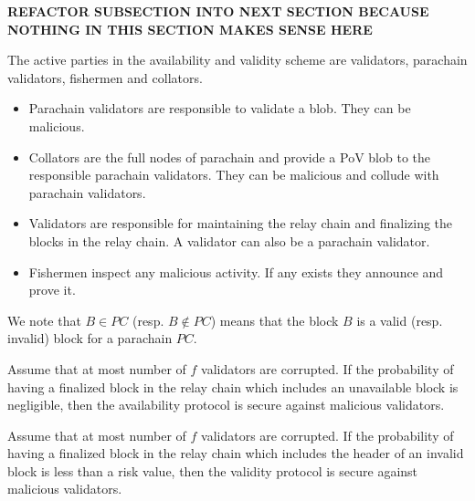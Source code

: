 {\bf REFACTOR SUBSECTION INTO NEXT SECTION BECAUSE NOTHING IN THIS SECTION MAKES SENSE HERE}



The active parties in the availability and validity scheme are validators, parachain validators, fishermen and collators. 


\begin{itemize}
\item Parachain validators are responsible to validate a blob. They can be malicious.
\item Collators are the full nodes of parachain and provide a PoV blob to the responsible parachain validators. They can be malicious and collude with parachain validators.
\item Validators are responsible for maintaining the relay chain and finalizing the blocks in the relay chain. A validator can also be a parachain validator. 
\item Fishermen inspect any malicious activity. If any exists they announce and prove it.  
\end{itemize}


We note that $B\in PC$ (resp. $B \notin PC$) means that the block $B$ is a valid (resp. invalid) block for a parachain $PC$.


\begin{definition}
Assume that at most number of $f$ validators are corrupted. If the probability of having a finalized block in the relay chain which includes an unavailable block is negligible, then the availability protocol is secure against malicious validators.
\end{definition}

\begin{definition}
Assume that  at most number of $f$ validators are corrupted. If the probability of having a finalized block in the relay chain which includes the header of an invalid block is less than a risk value, then the validity protocol is secure against malicious validators.
\end{definition}






